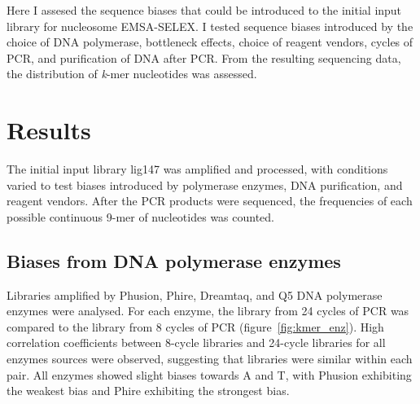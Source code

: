 \documentclass[parskip=full, numbers=noenddot]{scrbook}
\begin{document}
Here I assesed the sequence biases that could be introduced to the initial input library for nucleosome EMSA-SELEX.  I tested sequence biases introduced by the choice of DNA polymerase, bottleneck effects, choice of reagent vendors, cycles of PCR, and purification of DNA after PCR.  From the resulting sequencing data, the distribution of \emph{k}-mer nucleotides was assessed.

\section{Results}
\label{sec:pcrbias_results}

The initial input library lig147 was amplified and processed, with conditions varied to test biases introduced by polymerase enzymes, DNA purification, and reagent vendors.  After the PCR products were sequenced, the frequencies of each possible continuous 9-mer of nucleotides was counted.

\subsection{Biases from DNA polymerase enzymes}
\label{ssec:pcrbias_result_enz}

Libraries amplified by Phusion, Phire, Dreamtaq, and Q5 DNA polymerase enzymes were analysed.  For each enzyme, the library from 24 cycles of PCR was compared to the library from 8 cycles of PCR (figure~\ref{fig:kmer_enz}).  High correlation coefficients between 8-cycle libraries and 24-cycle libraries for all enzymes sources were observed, suggesting that libraries were similar within each pair.  All enzymes showed slight biases towards A and T, with Phusion exhibiting the weakest bias and Phire exhibiting the strongest bias.
\end{document}
